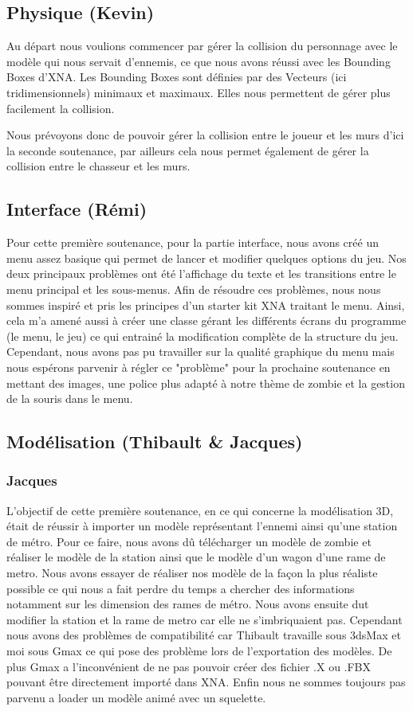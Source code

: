 \documentclass[12pt,a4paper]{article}  %
\begin{document}
\newpage

\subsection {Physique (Kevin)}
Au départ nous voulions commencer par gérer la collision du personnage avec le modèle qui nous servait d'ennemis, ce que nous avons réussi avec les Bounding Boxes d'XNA. Les Bounding Boxes sont définies par des Vecteurs (ici tridimensionnels) minimaux et maximaux. Elles nous permettent de gérer plus facilement la collision.

Nous prévoyons donc de pouvoir gérer la collision entre le joueur et les murs d'ici la seconde soutenance, par ailleurs cela nous permet également de gérer la collision entre le chasseur et les murs.

\subsection {Interface (Rémi)}
Pour cette première soutenance, pour la partie interface, nous avons créé un menu assez basique qui permet de lancer et modifier quelques options du jeu. Nos deux principaux problèmes ont été l'affichage du texte et les transitions entre le menu principal et les sous-menus. Afin de résoudre ces problèmes, nous nous sommes inspiré et pris les principes d'un starter kit XNA traitant le menu. Ainsi, cela m'a amené aussi à créer une classe gérant les différents écrans du programme (le menu, le jeu) ce qui entrainé la modification complète de la structure du jeu.
Cependant, nous avons pas pu travailler sur la qualité graphique du menu mais nous espérons parvenir à régler ce "problème" pour la prochaine soutenance en mettant des images, une police plus adapté à notre thème de zombie et la gestion de la souris dans le menu.

\newpage
\subsection {Modélisation (Thibault & Jacques)}
\subsubsection {Jacques}
L'objectif de cette première soutenance, en ce qui concerne la modélisation 3D, était de réussir à importer un modèle représentant l'ennemi ainsi qu'une station de métro. Pour ce faire, nous avons dû télécharger un modèle de zombie et réaliser le modèle de la station ainsi que le modèle d'un wagon d'une rame de metro. Nous avons essayer de réaliser nos modèle de la façon la plus réaliste possible ce qui nous a fait perdre du temps a chercher des informations notamment sur les dimension des rames de métro. Nous avons ensuite dut modifier la station et la rame de metro car elle ne s'imbriquaient pas. Cependant nous avons des problèmes de compatibilité car Thibault travaille sous 3dsMax et moi sous Gmax ce qui pose des problème lors de l'exportation des modèles. De plus Gmax a l'inconvénient de ne pas pouvoir créer des fichier .X ou .FBX pouvant être directement importé dans XNA. Enfin nous ne sommes toujours pas parvenu a loader un modèle animé avec un squelette.  \\
\end{document}
